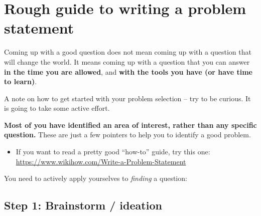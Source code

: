 \documentclass[
]{book}
\providecommand{\tightlist}{%
  \setlength{\itemsep}{0pt}\setlength{\parskip}{0pt}}
\begin{document}
\hypertarget{rough-guide-to-writing-a-problem-statement}{%
\chapter{Rough guide to writing a problem statement}\label{rough-guide-to-writing-a-problem-statement}}

Coming up with a good question does not mean coming up with a question
that will change the world. It means coming up with a question that you
can answer \textbf{in the time you are allowed}, and \textbf{with the tools you
have (or have time to learn)}.

A note on how to get started with your problem selection -- try to be
curious. It is going to take some active effort.

\textbf{Most of you have identified an area of interest, rather than any
specific question.} These are just a few pointers to help you to
identify a good problem.

\begin{itemize}
\tightlist
\item
  If you want to read a pretty good ``how-to'' guide, try this one:
  \url{https://www.wikihow.com/Write-a-Problem-Statement}
\end{itemize}

You need to actively apply yourselves to \emph{finding} a question:

\hypertarget{step-1-brainstorm-ideation}{%
\section{Step 1: Brainstorm / ideation}\label{step-1-brainstorm-ideation}}
\end{document}
